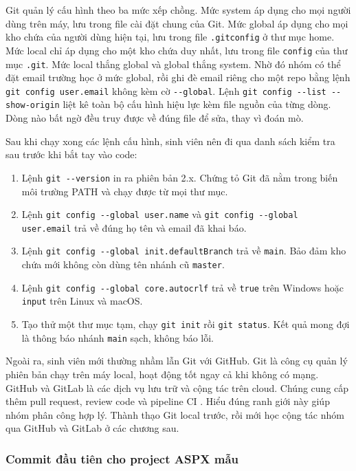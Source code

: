 Git quản lý cấu hình theo ba mức xếp chồng.
Mức system áp dụng cho mọi người dùng trên máy, lưu trong file cài đặt chung của Git.
Mức global áp dụng cho mọi kho chứa của người dùng hiện tại, lưu trong file \texttt{.gitconfig} ở thư mục home.
Mức local chỉ áp dụng cho một kho chứa duy nhất, lưu trong file \texttt{config} của thư mục \texttt{.git}.
Mức local thắng global và global thắng system.
Nhờ đó nhóm có thể đặt email trường học ở mức global, rồi ghi đè email riêng cho một repo bằng lệnh \verb|git config user.email| không kèm cờ \verb|--global|.
Lệnh \verb|git config --list --show-origin| liệt kê toàn bộ cấu hình hiệu lực kèm file nguồn của từng dòng.
Dòng nào bất ngờ đều truy được về đúng file để sửa, thay vì đoán mò.

Sau khi chạy xong các lệnh cấu hình, sinh viên nên đi qua danh sách kiểm tra sau trước khi bắt tay vào code:

\begin{enumerate}
\item Lệnh \verb|git --version| in ra phiên bản 2.x.
Chứng tỏ Git đã nằm trong biến môi trường PATH và chạy được từ mọi thư mục.
\item Lệnh \verb|git config --global user.name| và \verb|git config --global user.email| trả về đúng họ tên và email đã khai báo.
\item Lệnh \verb|git config --global init.defaultBranch| trả về \texttt{main}.
Bảo đảm kho chứa mới không còn dùng tên nhánh cũ \texttt{master}.
\item Lệnh \verb|git config --global core.autocrlf| trả về \texttt{true} trên Windows hoặc \texttt{input} trên Linux và macOS.
\item Tạo thử một thư mục tạm, chạy \verb|git init| rồi \verb|git status|.
Kết quả mong đợi là thông báo nhánh \texttt{main} sạch, không báo lỗi.
\end{enumerate}

Ngoài ra, sinh viên mới thường nhầm lẫn Git với GitHub.
Git là công cụ quản lý phiên bản chạy trên máy local, hoạt động tốt ngay cả khi không có mạng.
GitHub và GitLab là các dịch vụ lưu trữ và cộng tác trên cloud.
Chúng cung cấp thêm pull request, review code và pipeline CI \cite{githubdocs} \cite{gitlabdocs}.
Hiểu đúng ranh giới này giúp nhóm phân công hợp lý.
Thành thạo Git local trước, rồi mới học cộng tác nhóm qua GitHub và GitLab ở các chương sau.

\subsubsection{Commit đầu tiên cho project ASPX mẫu}
\label{subsubsec:c2-1-commit-dau-tien}

